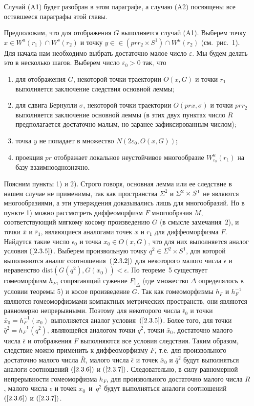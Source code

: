 \documentclass[12pt]{article}
\begin{document}
Случай (A1) будет разобран в этом параграфе, а случаю (A2) посвящены все оставшееся параграфы этой главы.

Предположим, что для отображения $G$ выполняется случай (A1). Выберем точку $x\in W^u(r_1)\cap W^s(r_2)$ и точку $y\in\allowbreak\in (pr r_2\times S^1)\cap W^u(r_2)$ (см.~рис.~1). Для начала нам необходимо выбрать достаточно малое число $\varepsilon$. Мы будем делать это в несколько шагов.
Выберем число $\varepsilon_0>0$ так, что
\begin{enumerate}
	\item[1)] для отображения $G$, некоторой точки траектории $O(x,G)$ и точки $r_1$ выполняется заключение следствия основной леммы;
	\item[2)] для сдвига Бернулли $\sigma$, некоторой точки траектории $O(pr x,\sigma)$ и точки $pr r_2$ выполняется заключение основной леммы (в этих двух пунктах число $R$ предполагается достаточно малым, но заранее зафиксированным числом);
	\item[3)] точка $y$ не попадает в множество $N(2\varepsilon_0,O(x,G))$;
	\item[4)] проекция $pr$ отображает локальное неустойчивое многообразие $W_{\varepsilon_0}^u(r_1)$ на базу взаимнооднозначно.
\end{enumerate}	
	
	Поясним пункты 1) и 2). Строго говоря, основная лемма или ее следствие в нашем случае не применимы, так как пространства $\Sigma^2$ и $\Sigma^2\nobreak\times\nobreak S^1$ не являются многообразиями, а эти утверждения доказывались лишь для многообразий. Но в пункте 1) можно рассмотреть диффеоморфизм $F$ многообразия $M$, соответствующий мягкому косому произведению $G$ (в смысле замечания~2), и точки $\bar{x}$ и $\bar{r}_1$, являющиеся аналогами точек $x$ и $r_1$ для диффеоморфизма $F$. Найдутся такие число $\epsilon_0$ и точка $x_0\in O(x,G)$, что для них выполняется аналог условия $(\ref{2.3.5})$. Выберем произвольную точку $q^2\in\Sigma^2\times S^1$, для которой выполняются аналог соотношения~$(\ref{2.3.2})$ для некоторого малого числа $\epsilon$ и неравенство
	$\textrm{dist}(G(q^2),G(x_0))<\epsilon$.
	По теореме~5 существует
гомеоморфизм $h_F$, сопрягающий сужение $F|_{\Delta}$ (где множество $\Delta$ определялось в условии теоремы 5) и косое произведение $G$. Так как гомеоморфизмы $h_F$ и $h_F^{-1}$ являются гомеоморфизмами компактных метрических пространств, они являются равномерно непрерывными. Поэтому для некоторого числа $\bar{\epsilon}_0$ и точки $\bar{x}_0=h_F^{-1}(x_0)$ выполняется аналог условия~$(\ref{2.3.5})$. Более того, для точки $\bar{q}^2=h_F^{-1}(q^2)$, являющейся аналогом точки $q^2$, точки $\bar{x}_0$, достаточно малого числа $\bar{\epsilon}$ и отображения $F$ выполняются все условия следствия. Таким образом, следствие можно применить к диффеоморфизму $F$, т.е. для произвольного достаточно малого числа $\bar{R}$, малого числа $\bar{\epsilon}$ и точек $\bar{x}_0$ и $\bar{q}^2$ будут выполняться аналоги соотношений $(\ref{2.3.6})$ и $(\ref{2.3.7})$. Следовательно, в силу равномерной непрерывности гомеоморфизма $h_F$, для произвольного достаточно малого числа $R$, малого числа $\epsilon$ и точек $x_0$~и~$q^2$ будут выполняться аналоги соотношений $(\ref{2.3.6})$ и $(\ref{2.3.7})$.   
\end{document}
